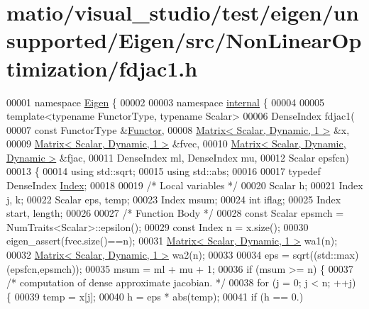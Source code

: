 \hypertarget{matio_2visual__studio_2test_2eigen_2unsupported_2_eigen_2src_2_non_linear_optimization_2fdjac1_8h_source}{}\section{matio/visual\+\_\+studio/test/eigen/unsupported/\+Eigen/src/\+Non\+Linear\+Optimization/fdjac1.h}
\label{matio_2visual__studio_2test_2eigen_2unsupported_2_eigen_2src_2_non_linear_optimization_2fdjac1_8h_source}

\begin{DoxyCode}
00001 \textcolor{keyword}{namespace }\hyperlink{namespace_eigen}{Eigen} \{ 
00002 
00003 \textcolor{keyword}{namespace }\hyperlink{namespaceinternal}{internal} \{
00004 
00005 \textcolor{keyword}{template}<\textcolor{keyword}{typename} FunctorType, \textcolor{keyword}{typename} Scalar>
00006 DenseIndex fdjac1(
00007         \textcolor{keyword}{const} FunctorType &\hyperlink{struct_functor}{Functor},
00008         \hyperlink{group___core___module}{Matrix< Scalar, Dynamic, 1 >}  &x,
00009         \hyperlink{group___core___module}{Matrix< Scalar, Dynamic, 1 >}  &fvec,
00010         \hyperlink{group___core___module}{Matrix< Scalar, Dynamic, Dynamic >} &fjac,
00011         DenseIndex ml, DenseIndex mu,
00012         Scalar epsfcn)
00013 \{
00014     \textcolor{keyword}{using} std::sqrt;
00015     \textcolor{keyword}{using} std::abs;
00016     
00017     \textcolor{keyword}{typedef} DenseIndex \hyperlink{namespace_eigen_a62e77e0933482dafde8fe197d9a2cfde}{Index};
00018 
00019     \textcolor{comment}{/* Local variables */}
00020     Scalar h;
00021     Index j, k;
00022     Scalar eps, temp;
00023     Index msum;
00024     \textcolor{keywordtype}{int} iflag;
00025     Index start, length;
00026 
00027     \textcolor{comment}{/* Function Body */}
00028     \textcolor{keyword}{const} Scalar epsmch = NumTraits<Scalar>::epsilon();
00029     \textcolor{keyword}{const} Index n = x.size();
00030     eigen\_assert(fvec.size()==n);
00031     \hyperlink{group___core___module}{Matrix< Scalar, Dynamic, 1 >}  wa1(n);
00032     \hyperlink{group___core___module}{Matrix< Scalar, Dynamic, 1 >}  wa2(n);
00033 
00034     eps = sqrt((std::max)(epsfcn,epsmch));
00035     msum = ml + mu + 1;
00036     \textcolor{keywordflow}{if} (msum >= n) \{
00037         \textcolor{comment}{/* computation of dense approximate jacobian. */}
00038         \textcolor{keywordflow}{for} (j = 0; j < n; ++j) \{
00039             temp = x[j];
00040             h = eps * abs(temp);
00041             \textcolor{keywordflow}{if} (h == 0.)

\end{DoxyCode}
